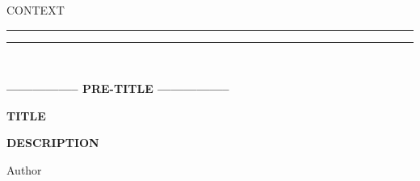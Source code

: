 \begin{titlepage}
    \begin{center}
        {{\Large{\textsc{CONTEXT}}}}
        \rule[0.1cm]{15.8cm}{0.1mm}
        \rule[0.5cm]{15.8cm}{0.6mm}
        \\
        \vspace{3mm}
    \end{center}
    \vspace{2mm}
    \begin{center}
        {\LARGE{\bf{----------------- PRE-TITLE -----------------}}}
        \vspace{5mm} \par \noindent
        {\Huge{\bf{TITLE}}}
        \vspace{10mm} \par \noindent
        {\LARGE \textbf{DESCRIPTION}}
        \vspace{15mm} \par \noindent
        {\Large Author}
    \end{center}
    \hfill
    \vspace{40mm}
\end{titlepage}
